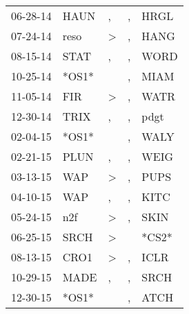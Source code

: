 \begin{supertabular}{p{0.07\textwidth}p{0.06\textwidth}p{0.02\textwidth}p{0.02\textwidth}p{0.06\textwidth}}
          06-28-14\textsuperscript{} &           HAUN\textsuperscript{} &                , &             , &           HRGL\textsuperscript{} \\
          07-24-14\textsuperscript{} &           reso\textsuperscript{} &     \textgreater &             , &           HANG\textsuperscript{} \\
          08-15-14\textsuperscript{} &           STAT\textsuperscript{} &                , &             , &           WORD\textsuperscript{} \\
          10-25-14\textsuperscript{} &                            *OS1* &                  &             , &           MIAM\textsuperscript{} \\
          11-05-14\textsuperscript{} &            FIR\textsuperscript{} &     \textgreater &             , &           WATR\textsuperscript{} \\
          12-30-14\textsuperscript{} &           TRIX\textsuperscript{} &                , &             , &           pdgt\textsuperscript{} \\
          02-04-15\textsuperscript{} &                            *OS1* &                  &             , &           WALY\textsuperscript{} \\
          02-21-15\textsuperscript{} &           PLUN\textsuperscript{} &                , &             , &           WEIG\textsuperscript{} \\
          03-13-15\textsuperscript{} &            WAP\textsuperscript{} &     \textgreater &             , &           PUPS\textsuperscript{} \\
          04-10-15\textsuperscript{} &            WAP\textsuperscript{} &                , &             , &           KITC\textsuperscript{} \\
          05-24-15\textsuperscript{} &            n2f\textsuperscript{} &     \textgreater &             , &           SKIN\textsuperscript{} \\
          06-25-15\textsuperscript{} &           SRCH\textsuperscript{} &     \textgreater &               &                            *CS2* \\
          08-13-15\textsuperscript{} &           CRO1\textsuperscript{} &     \textgreater &             , &           ICLR\textsuperscript{} \\
          10-29-15\textsuperscript{} &           MADE\textsuperscript{} &                , &             , &           SRCH\textsuperscript{} \\
          12-30-15\textsuperscript{} &                            *OS1* &                  &             , &           ATCH\textsuperscript{} \\

\end{supertabular}
